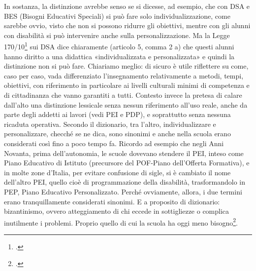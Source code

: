 In sostanza, la distinzione avrebbe senso se si dicesse, ad esempio, che con DSA e BES (Bisogni Educativi Speciali) si può fare solo individualizzazione, come sarebbe ovvio, visto che non si possono ridurre gli obiettivi, mentre con gli alunni con disabilità si può intervenire anche sulla personalizzazione. Ma la Legge 170/10\footcite{legge170} sui DSA dice chiaramente (articolo 5, comma 2 a) che questi alunni hanno diritto a una didattica «individualizzata e personalizzata» e quindi la distinzione non si può fare.
Chiariamo meglio: di sicuro è utile riflettere su come, caso per caso, vada differenziato l'insegnamento relativamente a metodi, tempi, obiettivi, con riferimento in particolare ai livelli culturali minimi di competenza e di cittadinanza che vanno garantiti a tutti. Contesto invece la pretesa di calare dall'alto una distinzione lessicale senza nessun riferimento all'uso reale, anche da parte degli addetti ai lavori (vedi PEI e PDP), e soprattutto senza nessuna ricaduta operativa.
Secondo il dizionario, tra l'altro, individualizzare e personalizzare, checché se ne dica, sono sinonimi e anche nella scuola erano considerati così fino a poco tempo fa. Ricordo ad esempio che negli Anni Novanta, prima dell'autonomia, le scuole dovevano stendere il PEI, inteso come Piano Educativo di Istituto (precursore del POF-Piano dell'Offerta Formativa), e in molte zone d'Italia, per evitare confusione di sigle, si è cambiato il nome dell'altro PEI, quello cioè di programmazione della disabilità, trasformandolo in PEP, Piano Educativo Personalizzato. Perché ovviamente, allora, i due termini erano tranquillamente considerati sinonimi.
E a proposito di dizionario: bizantinismo, ovvero atteggiamento di chi eccede in sottigliezze o complica inutilmente i problemi. Proprio quello di cui la scuola ha oggi meno bisogno\footcite{Fogarolo2014}.

 